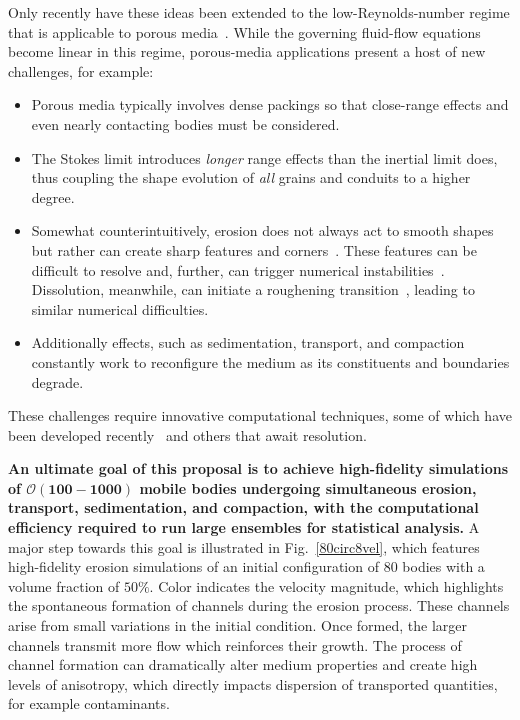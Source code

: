 \documentclass[11pt]{article}
\begin{document}
Only recently have these ideas been extended to the low-Reynolds-number regime that is applicable to porous media~\cite{mitchell2017generalized, Quaife2018}. While the governing fluid-flow equations become linear in this regime, porous-media applications present a host of new challenges, for example:
\begin{itemize}[noitemsep]
\item Porous media typically involves dense packings so that close-range effects and even nearly contacting bodies must be considered.

\item The Stokes limit introduces {\em longer} range effects than the inertial limit does, thus coupling the shape evolution of {\em all} grains and conduits to a higher degree.

\item Somewhat counterintuitively, erosion does not always act to smooth shapes but rather can create sharp features and corners~\cite{Ristroph2012}. These features can be difficult to resolve and, further, can trigger numerical instabilities~\cite{Quaife2018}. Dissolution, meanwhile, can initiate a roughening transition~\cite{claudin2017dissolution}, leading to similar numerical difficulties.

\item Additionally effects, such as sedimentation, transport, and compaction constantly work to reconfigure the medium as its constituents and boundaries degrade.
\end{itemize}
These challenges require innovative computational techniques, some of which have been developed recently~\cite{Quaife2018} and others that await resolution. 

{\bf An ultimate goal of this proposal is to achieve high-fidelity simulations of $\boldsymbol{\mathcal{O}(100-1000)}$ mobile bodies undergoing simultaneous erosion, transport, sedimentation, and compaction, with the computational efficiency required to run large ensembles for statistical analysis.} A major step towards this goal is illustrated in Fig.~\ref{80circ8vel}, which features high-fidelity erosion simulations of an initial configuration of 80 bodies with a volume fraction of $50 \%$. Color indicates the velocity magnitude, which highlights the spontaneous formation of channels during the erosion process. These channels arise from small variations in the initial condition. Once formed, the larger channels transmit more flow which reinforces their growth. The process of channel formation can dramatically alter medium properties and create high levels of anisotropy, which directly impacts dispersion of transported quantities, for example contaminants.
\end{document}
